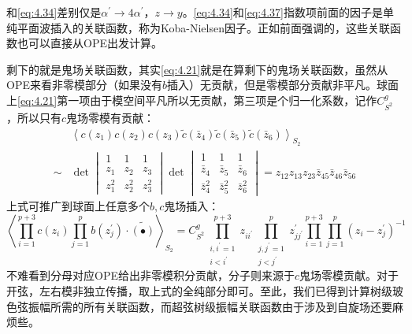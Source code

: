 和\ref{eq:4.34}差别仅是$\alpha^\prime\to4\alpha^\prime$，$z\to y$。\ref{eq:4.34}和\ref{eq:4.37}指数项前面的因子是单纯平面波插入的关联函数，称为Koba-Nielsen因子。正如前面强调的，这些关联函数也可以直接从OPE出发计算。

剩下的就是鬼场关联函数，其实\ref{eq:4.21}就是在算剩下的鬼场关联函数，虽然从OPE来看非零模部分（如果没有$b$插入）无贡献，但是零模部分贡献非平凡。球面上\ref{eq:4.21}第一项由于模空间平凡所以无贡献，第三项是个归一化系数，记作$C^g_{S^2}$，所以只有$c$鬼场零模有贡献：
\begin{equation}
\begin{aligned}
		&\left\langle c(z_1)c(z_2)c(z_3)\tilde{c}(\bar{z}_4)\tilde{c}(\bar{z}_5)\tilde{c}(\bar{z}_6)\right\rangle_{S_2}\\
	\sim&\det\begin{vmatrix}1&1&1\\z_1&z_2&z_3\\z_1^2&z_2^2&z_3^2\end{vmatrix}\det\begin{vmatrix}1&1&1\\\bar{z}_4&\bar{z}_5&\bar{z}_6\\\bar{z}_4^2&\bar{z}_5^2&\bar{z}_6^2\end{vmatrix}=z_{12}z_{13}z_{23}\bar{z}_{45}\bar{z}_{46}\bar{z}_{56}
\end{aligned}
\end{equation}
上式可推广到球面上任意多个$b,c$鬼场插入：
\begin{equation}
	\left\langle\prod_{i=1}^{p+3}c(z_i)\prod_{j=1}^pb(z_j^{\prime})\cdot\widetilde{(\bullet)}\right\rangle_{S_2}=C^g_{S^2}\prod_{\substack{i,i^{\prime}=1\\i<i^{\prime}}}^{p+3}z_{ii^{\prime}}\prod_{\substack{j,j^{\prime}=1\\j<j^{\prime}}}^pz_{jj^{\prime}}^{\prime}\prod_{i=1}^{p+3}\prod_{j=1}^p(z_i-z_j^{\prime})^{-1}
\end{equation}
不难看到分母对应OPE给出非零模积分贡献，分子则来源于$c$鬼场零模贡献。对于开弦，左右模非独立传播，取上式的全纯部分即可。至此，我们已得到计算树级玻色弦振幅所需的所有关联函数，而超弦树级振幅关联函数由于涉及到自旋场还要麻烦些。

